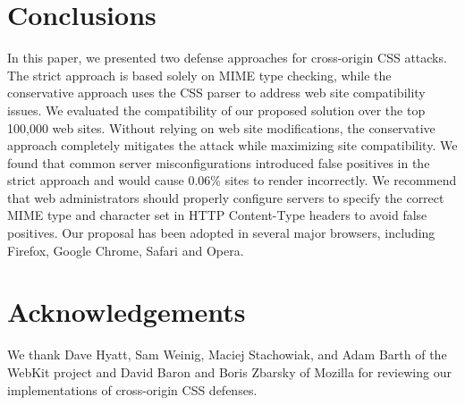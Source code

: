 \documentclass{acm_proc_article-sp}
\begin{document}
\section{Conclusions} \label{sec:conclusion}
In this paper, we presented two defense approaches for cross-origin CSS attacks. The strict approach is based solely on MIME type
checking, while the conservative approach uses the CSS parser to
address web site compatibility issues. We evaluated the compatibility of our
proposed solution over the top 100,000 web sites. Without relying on web site
modifications, the conservative approach completely mitigates the attack while
maximizing site compatibility. We found that common server misconfigurations
introduced false positives in the strict approach and would cause 0.06\%
sites to render incorrectly. We recommend that web administrators should
properly configure servers to specify the correct MIME type and character set in HTTP Content-Type headers to avoid false
positives. Our proposal has been adopted in several major browsers, including
Firefox, Google Chrome, Safari and Opera.

\section*{Acknowledgements}

We thank Dave Hyatt, Sam Weinig, Maciej Stachowiak, and Adam Barth of the
WebKit project and David Baron and Boris Zbarsky of Mozilla for reviewing our implementations of cross-origin CSS defenses.



\end{document}
